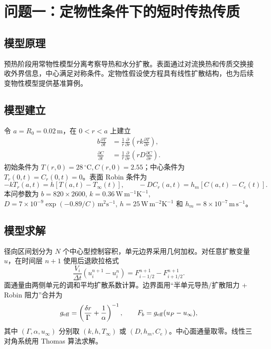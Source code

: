 \documentclass[withoutpreface,bwprint]{cumcmthesis}
\begin{document}
\section{问题一：定物性条件下的短时传热传质}
\subsection{模型原理}
预热阶段用常物性模型分离考察导热和水分扩散。表面通过对流换热和传质交换接收外界信息，中心满足对称条件。定物性假设使方程具有线性扩散结构，也为后续变物性模型提供基准算例。
\subsection{模型建立}
令 $a=R_0=0.02\,\mathrm{m}$，在 $0<r<a$ 上建立
\begin{align} b\frac{\partial T}{\partial t}&=\frac{1}{r}\frac{\partial}{\partial r}\left(rk\frac{\partial T}{\partial r}\right),\\ \frac{\partial C}{\partial t}&=\frac{1}{r}\frac{\partial}{\partial r}\left(rD\frac{\partial C}{\partial r}\right). \end{align}
初始条件为 $T(r,0)=28\,^{\circ}\mathrm{C},C(r,0)=2.55$；中心条件为 $T_r(0,t)=C_r(0,t)=0$。表面 Robin 条件为
\begin{equation} -kT_r(a,t)=h[T(a,t)-T_\infty(t)],\qquad -DC_r(a,t)=h_m[C(a,t)-C_e(t)]. \end{equation}
本问参数为 $b=820\times2600$, $k=0.36\,\mathrm{W\,m^{-1}K^{-1}}$, $D=7\times10^{-9}\exp(-0.89/C)\,\mathrm{m^2s^{-1}}$, $h=25\,\mathrm{W\,m^{-2}K^{-1}}$ 和 $h_m=8\times10^{-7}\,\mathrm{m\,s^{-1}}$。
\subsection{模型求解}
径向区间划分为 $N$ 个中心型控制容积，单元边界采用几何加权。对任意扩散变量 $u$，在时间层 $n+1$ 使用后退欧拉格式
\begin{equation} \frac{V_i}{\Delta t}(u_i^{n+1}-u_i^n)=F_{i-1/2}^{n+1}-F_{i+1/2}^{n+1}. \end{equation}
面通量由两侧单元的调和平均扩散系数计算。边界面用“半单元导热/扩散阻力 + Robin 阻力”合并为
\begin{equation} g_{\rm eff}=\left(\frac{\delta r}{\Gamma}+\frac{1}{\alpha}\right)^{-1},\qquad F_b=g_{\rm eff}(u_P-u_\infty), \end{equation}
其中 $(\Gamma,\alpha,u_\infty)$ 分别取 $(k,h,T_\infty)$ 或 $(D,h_m,C_e)$。中心面通量取零。线性三对角系统用 Thomas 算法求解。
\end{document}
